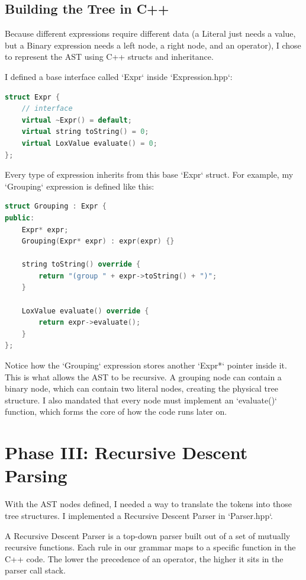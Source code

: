 \documentclass[12pt,a4paper,oneside]{report}
\begin{document}
\section{Building the Tree in C++}

Because different expressions require different data (a Literal just needs a value, but a Binary expression needs a left node, a right node, and an operator), I chose to represent the AST using C++ structs and inheritance. 

I defined a base interface called `Expr` inside `Expression.hpp`:

\begin{lstlisting}[language=C++]
struct Expr {
    // interface
    virtual ~Expr() = default;
    virtual string toString() = 0;
    virtual LoxValue evaluate() = 0;
};
\end{lstlisting}

Every type of expression inherits from this base `Expr` struct. For example, my `Grouping` expression is defined like this:

\begin{lstlisting}[language=C++]
struct Grouping : Expr {
public:
    Expr* expr;
    Grouping(Expr* expr) : expr(expr) {}

    string toString() override {
        return "(group " + expr->toString() + ")";
    }

    LoxValue evaluate() override {
        return expr->evaluate();
    }
};
\end{lstlisting}

Notice how the `Grouping` expression stores another `Expr*` pointer inside it. This is what allows the AST to be recursive. A grouping node can contain a binary node, which can contain two literal nodes, creating the physical tree structure. I also mandated that every node must implement an `evaluate()` function, which forms the core of how the code runs later on.

\chapter{Phase III: Recursive Descent Parsing}

With the AST nodes defined, I needed a way to translate the tokens into those tree structures. I implemented a Recursive Descent Parser in `Parser.hpp`.

A Recursive Descent Parser is a top-down parser built out of a set of mutually recursive functions. Each rule in our grammar maps to a specific function in the C++ code. The lower the precedence of an operator, the higher it sits in the parser call stack. 
\end{document}
